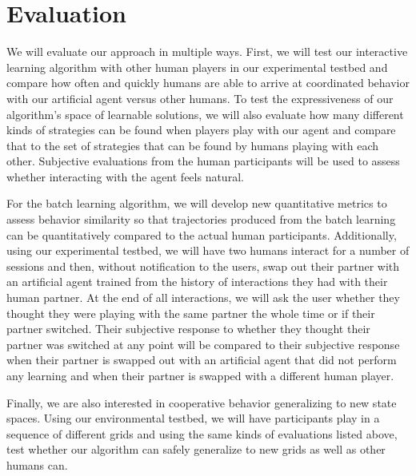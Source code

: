 
\section{Evaluation}

We will evaluate our approach in multiple ways. First, we will test
our interactive learning algorithm with other human players in our
experimental testbed and compare how often and quickly humans are able
to arrive at coordinated behavior with our artificial agent versus
other humans. To test the expressiveness of our algorithm's space of
learnable solutions, we will also evaluate how many different kinds of
strategies can be found when players play with our agent and compare
that to the set of strategies that can be found by humans playing with
each other.  Subjective evaluations from the human participants will
be used to assess whether interacting with the agent feels natural.

For the batch learning algorithm, we will develop new quantitative
metrics to assess behavior similarity so that trajectories produced
from the batch learning can be quantitatively compared to the actual
human participants. Additionally, using our experimental testbed, we
will have two humans interact for a number of sessions and then,
without notification to the users, swap out their partner with an
artificial agent trained from the history of interactions they had
with their human partner. At the end of all interactions, we will ask
the user whether they thought they were playing with the same partner
the whole time or if their partner switched. Their subjective response
to whether they thought their partner was switched at any point will
be compared to their subjective response when their partner is swapped
out with an artificial agent that did not perform any learning and
when their partner is swapped with a different human player.

Finally, we are also interested in cooperative behavior generalizing
to new state spaces. Using our environmental testbed, we will have
participants play in a sequence of different grids and using the same
kinds of evaluations listed above, test whether our algorithm can
safely generalize to new grids as well as other humans can.

